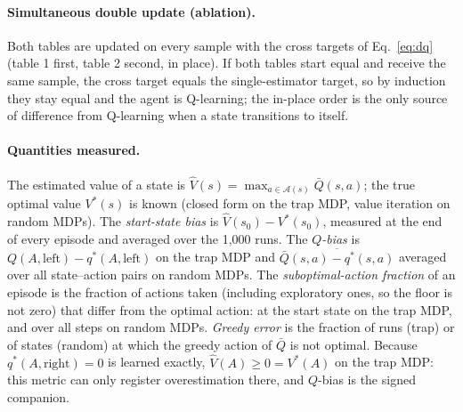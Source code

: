 \paragraph{Simultaneous double update (ablation).} Both tables are updated on every sample with the cross targets of Eq.~\eqref{eq:dq} (table 1 first, table 2 second, in place). If both tables start equal and receive the same sample, the cross target equals the single-estimator target, so by induction they stay equal and the agent is Q-learning; the in-place order is the only source of difference from Q-learning when a state transitions to itself.

\paragraph{Quantities measured.} The estimated value of a state is $\hat V(s)=\max_{a\in\mathcal A(s)}\bar Q(s,a)$; the true optimal value $V^\ast(s)$ is known (closed form on the trap MDP, value iteration on random MDPs). The \emph{start-state bias} is $\hat V(s_0)-V^\ast(s_0)$, measured at the end of every episode and averaged over the 1,000 runs. The \emph{$Q$-bias} is $Q(A,\text{left})-q^\ast(A,\text{left})$ on the trap MDP and $\overline{\bar Q(s,a)-q^\ast(s,a)}$ averaged over all state--action pairs on random MDPs. The \emph{suboptimal-action fraction} of an episode is the fraction of actions taken (including exploratory ones, so the floor is not zero) that differ from the optimal action: at the start state on the trap MDP, and over all steps on random MDPs. \emph{Greedy error} is the fraction of runs (trap) or of states (random) at which the greedy action of $\bar Q$ is not optimal. Because $q^\ast(A,\text{right})=0$ is learned exactly, $\hat V(A)\ge 0=V^\ast(A)$ on the trap MDP: this metric can only register overestimation there, and $Q$-bias is the signed companion.
